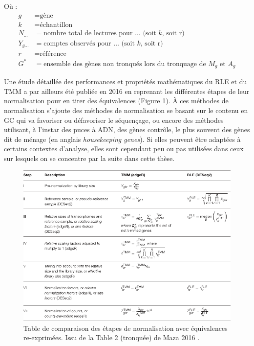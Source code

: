 Où :
\begin{align*}
    g & = \text{gène} \\
    k & = \text{échantillon} \\
    N_{…} & = \text{nombre total de lectures pour … (soit }k \text{, soit r)} \\
    Y_{g…} & = \text{comptes observés pour … (soit }k \text{, soit r)} \\
    r & = \text{référence} \\
    G^* & = \text{ensemble des gènes non tronqués lors du tronquage de } M_g \text{ et } A_g
\end{align*}



Une étude détaillée des performances et propriétés mathématiques du RLE et du TMM a par ailleurs été publiée en 2016 en reprenant les différentes étapes de leur normalisation pour en tirer des équivalences \cite{Maza2016} (Figure \ref{fig:maza2016_table2}). À ces méthodes de normalisation s'ajoute des méthodes de normalisation se basant sur le contenu en GC qui va favoriser ou défavoriser le séquençage, ou encore des méthodes utilisant, à l'instar des puces à ADN, des gènes contrôle, le plus souvent des gènes dit de ménage (en anglais \textit{housekeeping genes}). Si elles peuvent être adaptées à certains contextes d'analyse, elles sont cependant peu ou pas utilisées dans ceux sur lesquels on se concentre par la suite dans cette thèse. 

\begin{figure}[!h]
    \centering
    \includegraphics{img/intro/2_meth_transcripto/intro_2_maza2016_table2.pdf}
    \caption{Table de comparaison des étapes de normalisation avec équivalences re-exprimées. Issu de la Table 2 (tronquée) de Maza 2016 \cite{Maza2016}.}
    \label{fig:maza2016_table2}
\end{figure}

